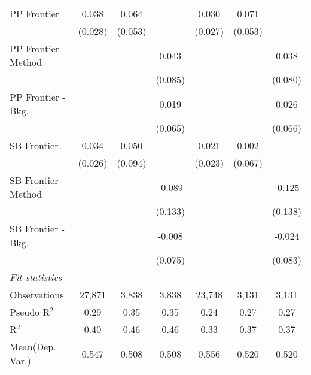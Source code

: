 \begin{tabular}{lcccccc}
   PP Frontier          & 0.038        & 0.064       &                & 0.030          & 0.071       &   \\   
                        & (0.028)      & (0.053)     &                & (0.027)        & (0.053)     &   \\   
   PP Frontier - Method &              &             & 0.043          &                &             & 0.038\\   
                        &              &             & (0.085)        &                &             & (0.080)\\   
   PP Frontier - Bkg.   &              &             & 0.019          &                &             & 0.026\\   
                        &              &             & (0.065)        &                &             & (0.066)\\   
   SB Frontier          & 0.034        & 0.050       &                & 0.021          & 0.002       &   \\   
                        & (0.026)      & (0.094)     &                & (0.023)        & (0.067)     &   \\   
   SB Frontier - Method &              &             & -0.089         &                &             & -0.125\\   
                        &              &             & (0.133)        &                &             & (0.138)\\   
   SB Frontier - Bkg.   &              &             & -0.008         &                &             & -0.024\\   
                        &              &             & (0.075)        &                &             & (0.083)\\   
   \midrule
   \emph{Fit statistics}\\
   Observations         & 27,871       & 3,838       & 3,838          & 23,748         & 3,131       & 3,131\\  
   Pseudo R$^2$         & 0.29         & 0.35        & 0.35           & 0.24           & 0.27        & 0.27\\  
   R$^2$                & 0.40         & 0.46        & 0.46           & 0.33           & 0.37        & 0.37\\  
Mean(Dep. Var.) & 0.547 & 0.508 & 0.508 & 0.556 & 0.520 & 0.520 \\
   

\end{tabular}
